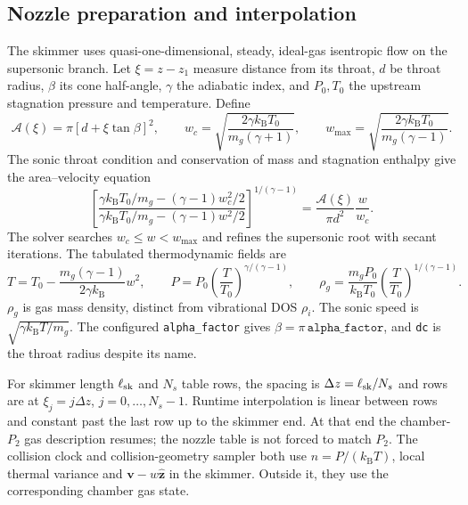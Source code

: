 \documentclass[10pt,a4paper]{article}
\newcommand{\kb}{k_{\mathrm B}}
\begin{document}
\subsection{Nozzle preparation and interpolation}\label{sec:nozzle}
The skimmer uses quasi-one-dimensional, steady, ideal-gas isentropic flow on
the supersonic branch. Let $\xi=z-z_1$ measure distance from its throat,
$d$ be throat radius, $\beta$ its cone half-angle, $\gamma$ the adiabatic index,
and $P_0,T_0$ the upstream stagnation pressure and temperature. Define
\[
 \mathcal A(\xi)=\pi[d+\xi\tan\beta]^2,\qquad
 w_c=\sqrt{\frac{2\gamma\kb T_0}{m_g(\gamma+1)}},\qquad
 w_{\max}=\sqrt{\frac{2\gamma\kb T_0}{m_g(\gamma-1)}}.
\]
The sonic throat condition and conservation of mass and stagnation enthalpy
give the area--velocity equation
\begin{equation}
 \left[
 \frac{\gamma\kb T_0/m_g-(\gamma-1)w_c^2/2}
 {\gamma\kb T_0/m_g-(\gamma-1)w^2/2}
 \right]^{1/(\gamma-1)}
 =\frac{\mathcal A(\xi)}{\pi d^2}\frac{w}{w_c}.
\label{eq:nozzle}
\end{equation}
The solver searches $w_c\leq w<w_{\max}$ and refines the supersonic root with
secant iterations. The tabulated thermodynamic fields are
\[
 T=T_0-\frac{m_g(\gamma-1)}{2\gamma\kb}w^2,\qquad
 P=P_0\left(\frac T{T_0}\right)^{\gamma/(\gamma-1)},\qquad
 \rho_g=\frac{m_gP_0}{\kb T_0}
 \left(\frac T{T_0}\right)^{1/(\gamma-1)}.
\]
$\rho_g$ is gas mass density, distinct from vibrational DOS $\rho_i$.
The sonic speed is $\sqrt{\gamma\kb T/m_g}$. The configured
\texttt{alpha\_factor} gives $\beta=\pi\,\texttt{alpha\_factor}$, and
\texttt{dc} is the throat radius despite its name.

For skimmer length $\ell_{\rm sk}$ and $N_s$ table rows, the spacing is
$\Delta z=\ell_{\rm sk}/N_s$ and rows are at $\xi_j=j\Delta z$,
$j=0,\ldots,N_s-1$. Runtime interpolation is linear between rows and constant
past the last row up to the skimmer end. At that end the chamber-$P_2$ gas
description resumes; the nozzle table is not forced to match $P_2$.
The collision clock and collision-geometry sampler both use
$n=P/(\kb T)$, local thermal variance and $\mathbf v-w\hat{\mathbf z}$
in the skimmer. Outside it, they use the corresponding chamber gas state.
\end{document}
